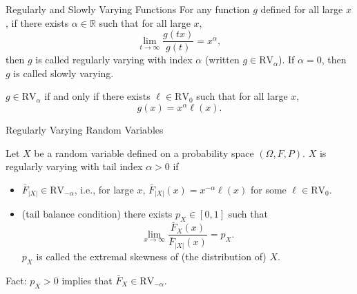 \documentclass{beamer}
\def\R{\mathbb R}
\def\RV{\text{RV}}
\begin{document}
\begin{frame}{Regularly and Slowly Varying Functions}
    For any function $g$ defined for all large $x$, if there exists $\alpha \in \R$ such that for all large $x$,
    \[
    \lim_{t \to \infty} \frac{g(t x)}{g(t)} = x^{\alpha},
    \]
    then $g$ is called regularly varying with index $\alpha$ (written $g \in \RV_{\alpha}$). If $\alpha = 0$, then $g$ is called slowly varying.
    \begin{theorem}
        $g \in \RV_{\alpha}$ if and only if there exists $\ell \in \RV_0$ such that for all large $x$,
        \[
        g(x) = x^{\alpha}\ell(x).
        \]
    \end{theorem}
\end{frame}

\begin{frame}{Regularly Varying Random Variables}
    \begin{definition}
        Let $X$ be a random variable defined on a probability space $(\Omega, F, P)$. $X$ is regularly varying with tail index $\alpha > 0$ if
        \begin{itemize}
            \item $\bar{F}_{|X|} \in \RV_{-\alpha}$, i.e., for large $x$, $\bar{F}_{|X|}(x) = x^{-\alpha}\ell(x)$ for some $\ell \in \RV_0$.
            \item (tail balance condition) there exists $p_X \in [0, 1]$ such that
            \[
            \lim_{x \to \infty} \frac{\bar{F}_X(x)}{\bar{F}_{|X|}(x)} = p_X.
            \]
            $p_X$ is called the extremal skewness of (the distribution of) $X$.
        \end{itemize}
    \end{definition}
    Fact: $p_X > 0$ implies that $\bar{F}_X \in \RV_{-\alpha}$.
\end{frame}
\end{document}
